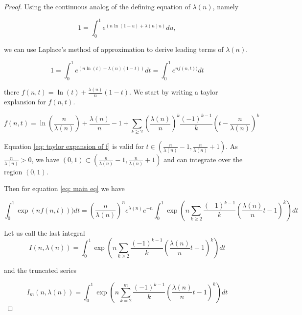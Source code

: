 \documentclass[12pt]{article}
\theoremstyle{plain}
\theoremstyle{definition}
\theoremstyle{remark}
\theoremstyle{definition}
\begin{document}
\begin{proof}
    Using the continuous analog of the defining equation of $\lambda(n)$, namely
    
    \begin{equation}\label{eq: main relation extended}
        1 = \int_0^1 e^{(n\ln{(1-u)}+\lambda(n)u)} du,
    \end{equation}    

we can use Laplace's method of approximation to derive leading terms of $\lambda(n)$.

\begin{equation}\label{eq: main eq}
    1 = \int_0^1 e^{(n\ln{(t)}+\lambda(n)(1-t))} dt = \int_0^1 e^{nf(n,t))}dt
\end{equation}

there $f(n,t) = \ln{(t)}+\frac{\lambda(n)}{n}(1-t)$. We start by writing a taylor explansion for $f(n,t)$.

\begin{equation}\label{eq: taylor expansion of f}
    f(n,t) = \ln \left(\frac{n}{\lambda(n)}\right) + \frac{\lambda(n)}{n} -1 + \sum_{k \geq 2}\left(\frac{\lambda(n)}{n}\right)^k \frac{(-1)^{k-1}}{k}\left(t-\frac{n}{\lambda(n)}\right)^k
\end{equation}

Equation \ref{eq: taylor expansion of f} is valid for $t \in (\frac{n}{\lambda(n)}-1, \frac{n}{\lambda(n)}+1)$. As $\frac{n}{\lambda(n)} > 0$, we have $(0,1) \subset (\frac{n}{\lambda(n)}-1, \frac{n}{\lambda(n)}+1)$ and can integrate over the region $(0,1)$.

Then for equation \ref{eq: main eq} we have 

\begin{equation}
    \int_0^1 \exp{(nf(n,t)))} dt = \left(\frac{n}{\lambda(n)}\right)^n e^{\lambda(n)}e^{-n}\int_0^1\exp{\left(n\sum_{k\geq2}\frac{(-1)^{k-1}}{k}\left(\frac{\lambda(n)}{n}t-1\right)^k\right)}dt
\end{equation}

Let us call the last integral 
\begin{equation}
    I(n,\lambda(n)) = \int_0^1\exp{\left(n\sum_{k\geq2}\frac{(-1)^{k-1}}{k}\left(\frac{\lambda(n)}{n}t-1\right)^k\right)}dt
\end{equation}

and the truncated series 

\begin{equation}
    I_m(n,\lambda(n)) = \int_0^1\exp{\left(n\sum_{k=2}^m\frac{(-1)^{k-1}}{k}\left(\frac{\lambda(n)}{n}t-1\right)^k\right)}dt
\end{equation}


\end{proof}
\end{document}

